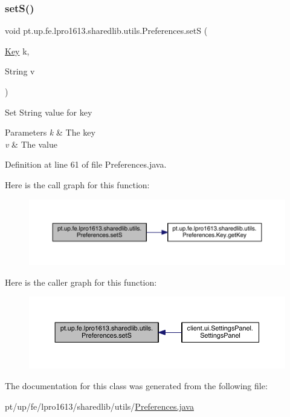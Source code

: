 \subsubsection{\texorpdfstring{set\+S()}{setS()}}
{\footnotesize\ttfamily void pt.\+up.\+fe.\+lpro1613.\+sharedlib.\+utils.\+Preferences.\+setS (\begin{DoxyParamCaption}\item[{\hyperlink{interfacept_1_1up_1_1fe_1_1lpro1613_1_1sharedlib_1_1utils_1_1_preferences_1_1_key}{Key}}]{k,  }\item[{String}]{v }\end{DoxyParamCaption})}

Set String value for key


\begin{DoxyParams}{Parameters}
{\em k} & The key \\
\hline
{\em v} & The value \\
\hline
\end{DoxyParams}


Definition at line 61 of file Preferences.\+java.

Here is the call graph for this function\+:
\nopagebreak
\begin{figure}[H]
\begin{center}
\leavevmode
\includegraphics[width=350pt]{classpt_1_1up_1_1fe_1_1lpro1613_1_1sharedlib_1_1utils_1_1_preferences_a7ef4c07c94b75f3bb5cf27c4533f01b6_cgraph}
\end{center}
\end{figure}
Here is the caller graph for this function\+:
\nopagebreak
\begin{figure}[H]
\begin{center}
\leavevmode
\includegraphics[width=350pt]{classpt_1_1up_1_1fe_1_1lpro1613_1_1sharedlib_1_1utils_1_1_preferences_a7ef4c07c94b75f3bb5cf27c4533f01b6_icgraph}
\end{center}
\end{figure}


The documentation for this class was generated from the following file\+:\begin{DoxyCompactItemize}
\item 
pt/up/fe/lpro1613/sharedlib/utils/\hyperlink{_preferences_8java}{Preferences.\+java}\end{DoxyCompactItemize}
